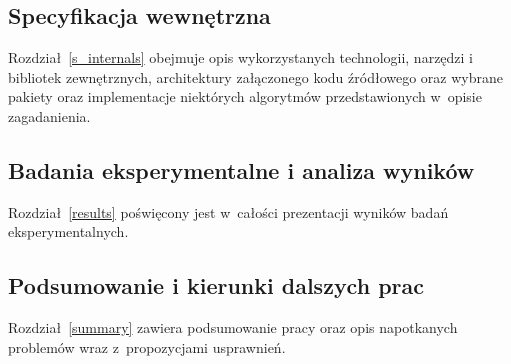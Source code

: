 \subsection{Specyfikacja wewnętrzna}
\par{
  Rozdział~\ref{s_internals} obejmuje opis wykorzystanych technologii, narzędzi i bibliotek zewnętrznych, architektury załączonego kodu źródłowego oraz wybrane pakiety oraz implementacje niektórych algorytmów przedstawionych w~opisie zagadanienia.
}
\subsection{Badania eksperymentalne i analiza wyników}
\par{
  Rozdział~\ref{results} poświęcony jest w~całości prezentacji wyników badań eksperymentalnych.
}
\subsection{Podsumowanie i kierunki dalszych prac}
\par{
  Rozdział~\ref{summary} zawiera podsumowanie pracy oraz opis napotkanych problemów wraz z~propozycjami usprawnień.
}
